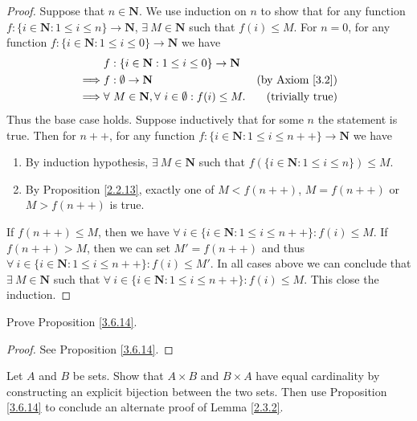 \begin{proof}
    Suppose that \(n \in \mathbf{N}\).
    We use induction on \(n\) to show that for any function \(f : \{i \in \mathbf{N} : 1 \leq i \leq n\} \to \mathbf{N}\), \(\exists\ M \in \mathbf{N}\) such that \(f(i) \leq M\).
    For \(n = 0\), for any function \(f : \{i \in \mathbf{N} : 1 \leq i \leq 0\} \to \mathbf{N}\) we have
    \begin{align*}
                 & f : \{i \in \mathbf{N} : 1 \leq i \leq 0\} \to \mathbf{N}                                        \\
        \implies & f : \emptyset \to \mathbf{N}                                       & \text{(by Axiom \ref{3.2})} \\
        \implies & \forall\ M \in \mathbf{N}, \forall\ i \in \emptyset : f(i) \leq M. & \text{(trivially true)}     \\
    \end{align*}
    Thus the base case holds.
    Suppose inductively that for some \(n\) the statement is true.
    Then for \(n++\), for any function \(f : \{i \in \mathbf{N} : 1 \leq i \leq n++\} \to \mathbf{N}\) we have
    \begin{enumerate}
        \item By induction hypothesis, \(\exists\ M \in \mathbf{N}\) such that \(f(\{i \in \mathbf{N} : 1 \leq i \leq n\}) \leq M\).
        \item By Proposition \ref{2.2.13}, exactly one of \(M < f(n++)\), \(M = f(n++)\) or \(M > f(n++)\) is true.
    \end{enumerate}
    If \(f(n++) \leq M\), then we have \(\forall\ i \in \{i \in \mathbf{N} : 1 \leq i \leq n++\} : f(i) \leq M\).
    If \(f(n++) > M\), then we can set \(M' = f(n++)\) and thus \(\forall\ i \in \{i \in \mathbf{N} : 1 \leq i \leq n++\} : f(i) \leq M'\).
    In all cases above we can conclude that \(\exists\ M \in \mathbf{N}\) such that \(\forall\ i \in \{i \in \mathbf{N} : 1 \leq i \leq n++\} : f(i) \leq M\).
    This close the induction.
\end{proof}

\begin{exercise}\label{ex 3.6.4}
    Prove Proposition \ref{3.6.14}.
\end{exercise}

\begin{proof}
    See Proposition \ref{3.6.14}.
\end{proof}

\begin{exercise}\label{ex 3.6.5}
    Let \(A\) and \(B\) be sets.
    Show that \(A \times B\) and \(B \times A\) have equal cardinality by constructing an explicit bijection between the two sets.
    Then use Proposition \ref{3.6.14} to conclude an alternate proof of Lemma \ref{2.3.2}.
\end{exercise}

